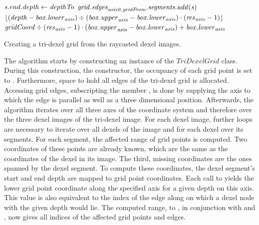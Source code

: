 \begin{algorithm}
\begin{algorithmic}[1]
								\EndIf
									\State $\mathit{s}.\mathit{end}.\mathit{depth} \gets \mathit{depthTo}$
								\EndIf
								\State $\mathit{grid}.\mathit{edges}_{\mathit{axis0}, \mathit{gridFrom}}.\mathit{segments}.\mathit{add}(\mathit{s})$ \label{alg:line:grid_edge_insertion}
							\EndFor
						\EndFor
					\EndFor
				\EndFor
			\EndFor
		\EndFunction
		\\
			\State \Return $\lfloor(\mathit{depth} - \mathit{box}.\mathit{lower}_{\mathit{axis}}) \div (\mathit{box}.\mathit{upper}_{\mathit{axis}} - \mathit{box}.\mathit{lower}_{\mathit{axis}}) \cdot (\mathit{res}_{\mathit{axis}} - 1)\rfloor$
		\EndFunction
		\\
			\State \Return $\mathit{gridCoord} \div (\mathit{res}_{\mathit{axis}} - 1) \cdot (\mathit{box}.\mathit{upper}_{\mathit{axis}} - \mathit{box}.\mathit{lower}_{\mathit{axis}}) + \mathit{box}.\mathit{lower}_{\mathit{axis}}$
		\EndFunction
	\end{algorithmic}
	\caption{
		Creating a tri-dexel grid from the raycasted dexel images.
	}
	\label{alg:tri_dexel_grid_generation}
\end{algorithm}
%
The algorithm starts by constructing an instance of the $TriDexelGrid$ class.
During this construction, \ie the constructor, the occupancy of each grid point is set to \False.
Furthermore, space to hold all edges of the tri-dexel grid is allocated.
Accessing grid edges, \ie subscripting the member , is done by supplying the axis to which the edge is parallel as well as a three dimensional position.
Afterwards, the algorithm iterates over all three axes of the coordinate system and therefore over the three dexel images of the tri-dexel image.
For each dexel image, further loops are necessary to iterate over all dexels of the image and for each dexel over its segments.
For each segment, the affected range of grid points is computed.
Two coordinates of these points are already known, which are the same as the coordinates of the dexel in its image.
The third, missing coordinates are the ones spanned by the dexel segment.
To compute these coordinates, the dexel segment's start and end depth are mapped to grid point coordinates.
Each call to  yields the lower grid point coordinate along the specified axis for a given depth on this axis.
This value is also equivalent to the index of the edge along  on which a dexel node with the given depth would lie.
The computed range,  to , in conjunction with  and , now gives all indices of the affected grid points and edges.
